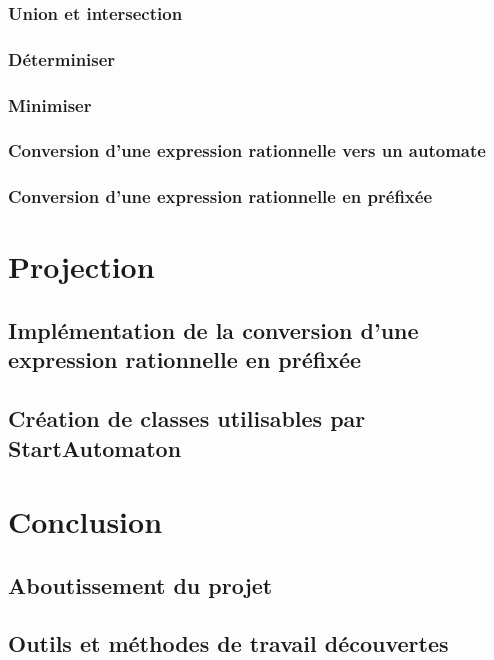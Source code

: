 \documentclass[a4paper, 12pt]{report}
\begin{document}
\subsubsection{Union et intersection}
\subsubsection{Déterminiser}
\subsubsection{Minimiser}
\subsubsection{Conversion d'une expression rationnelle vers un automate}
\subsubsection{Conversion d'une expression rationnelle en préfixée}

\section{Projection}
\subsection{Implémentation de la conversion d'une expression rationnelle en préfixée}
\subsection{Création de classes utilisables par StartAutomaton}

\section{Conclusion}
\subsection{Aboutissement du projet}
\subsection{Outils et méthodes de travail découvertes}
\end{document}
